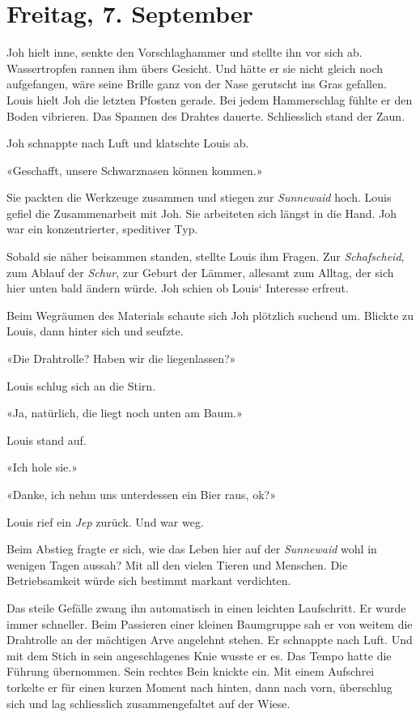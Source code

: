 \section{Freitag, 7. September}\label{freitag-7.-september}

Joh hielt inne, senkte den Vorschlaghammer und stellte ihn vor sich ab.
Wassertropfen rannen ihm übers Gesicht. Und hätte er sie nicht gleich
noch aufgefangen, wäre seine Brille ganz von der Nase gerutscht ins Gras
gefallen. Louis hielt Joh die letzten Pfosten gerade. Bei jedem
Hammerschlag fühlte er den Boden vibrieren. Das Spannen des Drahtes
dauerte. Schliesslich stand der Zaun.

Joh schnappte nach Luft und klatschte Louis ab.

«Geschafft, unsere Schwarznasen können kommen.»

Sie packten die Werkzeuge zusammen und stiegen zur \emph{Sunnewaid}
hoch. Louis gefiel die Zusammenarbeit mit Joh. Sie arbeiteten sich
längst in die Hand. Joh war ein konzentrierter, speditiver Typ.

Sobald sie näher beisammen standen, stellte Louis ihm Fragen. Zur
\emph{Schafscheid}, zum Ablauf der \emph{Schur}, zur Geburt der Lämmer,
allesamt zum Alltag, der sich hier unten bald ändern würde. Joh schien
ob Louis` Interesse erfreut.

Beim Wegräumen des Materials schaute sich Joh plötzlich suchend um.
Blickte zu Louis, dann hinter sich und seufzte.

«Die Drahtrolle? Haben wir die liegenlassen?»

Louis schlug sich an die Stirn.

«Ja, natürlich, die liegt noch unten am Baum.»

Louis stand auf.

«Ich hole sie.»

«Danke, ich nehm uns unterdessen ein Bier raus, ok?»

Louis rief ein \emph{Jep} zurück. Und war weg.

Beim Abstieg fragte er sich, wie das Leben hier auf der \emph{Sunnewaid}
wohl in wenigen Tagen aussah? Mit all den vielen Tieren und Menschen.
Die Betriebsamkeit würde sich bestimmt markant verdichten.

Das steile Gefälle zwang ihn automatisch in einen leichten Laufschritt.
Er wurde immer schneller. Beim Passieren einer kleinen Baumgruppe sah er
von weitem die Drahtrolle an der mächtigen Arve angelehnt stehen. Er
schnappte nach Luft. Und mit dem Stich in sein angeschlagenes Knie
wusste er es. Das Tempo hatte die Führung übernommen. Sein rechtes Bein
knickte ein. Mit einem Aufschrei torkelte er für einen kurzen Moment
nach hinten, dann nach vorn, überschlug sich und lag schliesslich
zusammengefaltet auf der Wiese.

